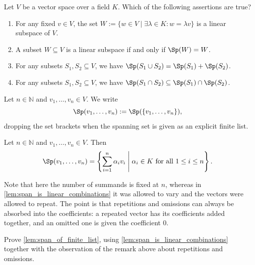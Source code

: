 \begin{exercise}
\label{exc:span_subspaces_mc}
Let $V$ be a vector space over a field $K$. Which of the following assertions are true?
\begin{enumerate}
    \item For any fixed $v \in V$, the set $W := \{w \in V \mid \exists \lambda \in K : w = \lambda v\}$ is a linear subspace of $V$.
    \item A subset $W \subseteq V$ is a linear subspace if and only if $\Sp(W) = W$.
    \item For any subsets $S_1, S_2 \subseteq V$, we have $\Sp(S_1 \cup S_2) = \Sp(S_1) + \Sp(S_2)$.
    \item For any subsets $S_1, S_2 \subseteq V$, we have $\Sp(S_1 \cap S_2) \subseteq \Sp(S_1) \cap \Sp(S_2)$.
\end{enumerate}
\end{exercise}

\begin{notation}
\label{not:span_of_a_list}
Let $n \in \mathbb{N}$ and $v_1, \dots, v_n \in V$. We write
\[
\Sp(v_1, \dots, v_n) := \Sp(\{v_1, \dots, v_n\}),
\]
dropping the set brackets when the spanning set is given as an explicit finite list.
\end{notation}

\begin{lemma}
\label{lem:span_of_finite_list}
Let $n \in \mathbb{N}$ and $v_1, \dots, v_n \in V$. Then
\[
\Sp(v_1, \dots, v_n) = \left\{ \sum_{i=1}^{n} \alpha_i v_i \;\middle|\; \alpha_i \in K \text{ for all } 1 \le i \le n \right\}.
\]
\end{lemma}

\begin{remark}
\label{rem:fixed_number_of_summands}
Note that here the number of summands is fixed at $n$, whereas in \cref{lem:span_is_linear_combinations} it was allowed to vary and the vectors were allowed to repeat. The point is that repetitions and omissions can always be absorbed into the coefficients: a repeated vector has its coefficients added together, and an omitted one is given the coefficient $0$.
\end{remark}

\begin{exercise}
\label{exc:span_of_finite_list}
Prove \cref{lem:span_of_finite_list}, using \cref{lem:span_is_linear_combinations} together with the observation of the remark above about repetitions and omissions.
\end{exercise}

